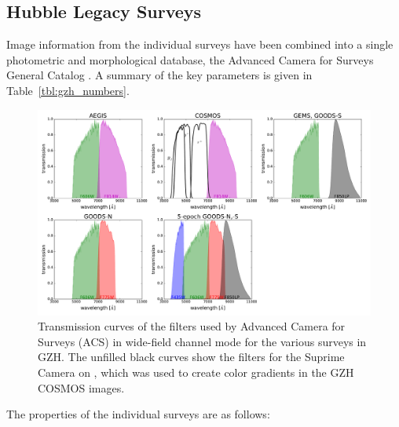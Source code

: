 \documentclass[twocolumn]{aastex6}
\begin{document}
\subsection{Hubble Legacy Surveys}\label{ssec:legacy_surveys}

Image information from
the individual surveys have been combined into a single photometric and
morphological database, the Advanced Camera for Surveys General Catalog
\citep[ACS-GC;][]{gri12}. A summary of the key parameters is given in
Table~\ref{tbl:gzh_numbers}. 


\begin{figure}
\center
\includegraphics[width=160mm]{figures/filter_curves.pdf}
\caption{Transmission curves of the filters used by \hst{} Advanced Camera for
Surveys (ACS) in wide-field channel mode for the various surveys in GZH. The
unfilled black curves show the filters for the Suprime Camera on \subaru, which
was used to create color gradients in the GZH COSMOS
images.\label{fig:filtercurves}}
\end{figure}

The properties of the individual surveys are as follows:
\end{document}
